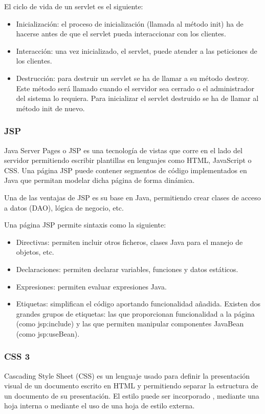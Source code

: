 El ciclo de vida de un servlet es el siguiente:

\begin{itemize}
	\item Inicialización: el proceso de inicialización (llamada al método init) ha de hacerse antes de que el servlet pueda interaccionar con los clientes.
	\item Interacción: una vez inicializado, el servlet, puede atender a las peticiones de los clientes.
	\item Destrucción: para destruir un servlet se ha de llamar a su método destroy. Este método será llamado cuando el servidor sea cerrado o el administrador del sistema lo requiera. Para inicializar el servlet destruido se ha de llamar al método init de nuevo.
\end{itemize}

\subsubsection{JSP}
Java Server Pages o JSP \cite{jsp:wiki} es una tecnología de vistas que corre en el lado del servidor permitiendo escribir plantillas en lenguajes como HTML, JavaScript o CSS. Una página JSP puede contener segmentos de código implementados en Java que permitan modelar dicha página de forma dinámica.

Una de las ventajas de JSP es su base en Java, permitiendo crear clases de acceso a datos (DAO), lógica de negocio, etc.

Una página JSP permite sintaxis como la siguiente:

\begin{itemize}
	\item Directivas: permiten incluir otros ficheros, clases Java para el manejo de objetos, etc.
	\item Declaraciones: permiten declarar variables, funciones y datos estáticos.
	\item Expresiones: permiten evaluar expresiones Java.
	\item Etiquetas: simplifican el código aportando funcionalidad añadida. Existen dos grandes grupos de etiquetas: las que proporcionan funcionalidad a la página (como jsp:include) y las que permiten manipular componentes JavaBean (como jsp:useBean).
	
\end{itemize}

\subsubsection{CSS 3}
Cascading Style Sheet (CSS) es un lenguaje usado para definir la presentación visual de un documento escrito en HTML y  permitiendo separar la estructura de un documento de su presentación. El estilo puede ser incorporado , mediante una hoja interna o mediante el uso de una hoja de estilo externa.

